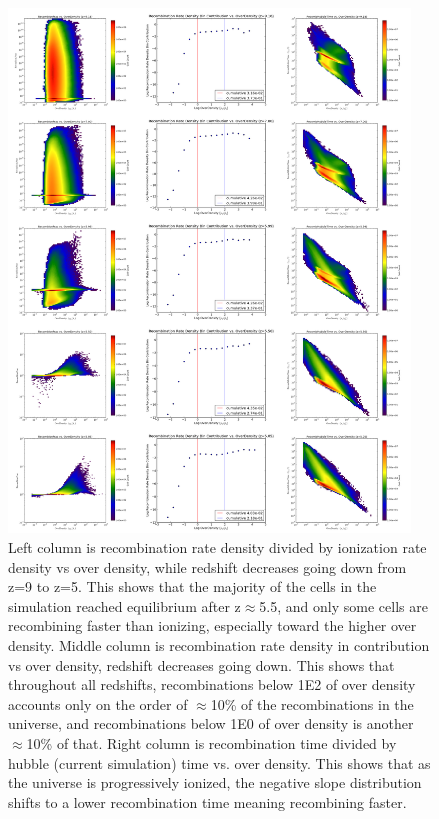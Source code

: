 \documentclass[letterpaper,10pt]{article}
\renewcommand{\(}{\left(}
\renewcommand{\)}{\right)}
\begin{document}
\begin{figure}[p] %
\centering
  \includegraphics[width=0.95\textwidth]{recomb.png}
  \caption{\footnotesize Left column is recombination rate density divided by ionization rate density vs over density, while redshift decreases going down from z=9 to z=5.  This shows that the majority of the cells in the simulation reached equilibrium after z$\approx$5.5, and only some cells are recombining faster than ionizing, especially toward the higher over density.  Middle column is recombination rate density in contribution vs over density, redshift decreases going down.  This shows that throughout all redshifts, recombinations below 1E2 of  over density accounts only on the order of $\approx$10\% of the recombinations in the universe, and recombinations below 1E0 of over density is another $\approx$10\% of that.  Right column is recombination time divided by hubble (current simulation) time vs. over density.  This shows that as the universe is progressively ionized, the negative slope distribution shifts to a lower recombination time meaning recombining faster.}
  \label{recombination}
\end{figure}
\end{document}
